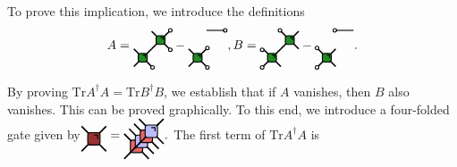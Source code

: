 \documentclass[aps,prx,twocolumn,notitlepage,nofootinbib,nobalancelastpage]{revtex4-2}
\theoremstyle{break}
\newcommand{\1}{\mathbbm{1}}
\theoremstyle{plain}
\theoremstyle{plain}
\theoremstyle{plain}
\newcommand{\Wgatedagger}[2]{
\draw[very thick] (#1-0.5, #2 +0.5) -- (#1+0.5,#2-0.5);
\draw[very thick] (#1-0.5,#2-0.5) -- (#1+0.5,#2+0.5);
\draw[ thick, fill=mygreenc, rounded corners=2pt] (#1-0.25,#2+0.25) rectangle (#1+0.25,#2-0.25);
\draw[thick] (#1,#2+0.15) -- (#1+0.15,#2+0.15) -- (#1+0.15,#2);
}
\newcommand{\Wgatered}[2]{
\draw[very thick] (#1-0.5, #2 +0.5) -- (#1+0.5,#2-0.5);
\draw[very thick] (#1-0.5,#2-0.5) -- (#1+0.5,#2+0.5);
\draw[ thick, fill=myred, rounded corners=2pt] (#1-0.25,#2+0.25) rectangle (#1+0.25,#2-0.25);
\draw[thick] (#1,#2+0.15) -- (#1+0.15,#2+0.15) -- (#1+0.15,#2);
}
\newcommand{\Wgateblue}[2]{
\draw[very thick] (#1-0.5, #2 +0.5) -- (#1+0.5,#2-0.5);
\draw[very thick] (#1-0.5,#2-0.5) -- (#1+0.5,#2+0.5);
\draw[ thick, fill=myblue, rounded corners=2pt] (#1-0.25,#2+0.25) rectangle (#1+0.25,#2-0.25);
\draw[thick] (#1,#2+0.15) -- (#1+0.15,#2+0.15) -- (#1+0.15,#2);
}
\newcommand{\Wgategreen}[2]{
\draw[very thick] (#1-0.5, #2 +0.5) -- (#1+0.5,#2-0.5);
\draw[very thick] (#1-0.5,#2-0.5) -- (#1+0.5,#2+0.5);
\draw[ thick, fill=mygreen, rounded corners=2pt] (#1-0.25,#2+0.25) rectangle (#1+0.25,#2-0.25);
\draw[thick] (#1,#2+0.15) -- (#1+0.15,#2+0.15) -- (#1+0.15,#2);
}
\newcommand{\MYcircle}[2]{
\draw[thick, fill=white] (#1,#2) circle (0.1cm); }
\begin{document}
To prove this implication, we introduce the definitions \begin{equation}
A=
\begin{tikzpicture}[baseline=(current  bounding  box.center), scale=0.5]
\Wgategreen{-0.5}{-0.5}
\Wgategreen{0.5}{0.5}
\MYcircle{1.05}{1.05}
\MYcircle{1.05}{-0.05}
\MYcircle{0.05}{-1.05}
\end{tikzpicture}
-
\begin{tikzpicture}[baseline=(current  bounding  box.center), scale=0.5]
\Wgategreen{-0.5}{-0.5}
\MYcircle{1.05}{1.05}
\MYcircle{0.05}{0.05}
\MYcircle{0.05}{-1.05}
\draw[thick] (0,1.05)--(1,1.05);
\end{tikzpicture}
,
B=
\begin{tikzpicture}[baseline=(current  bounding  box.center), scale=0.5]
\Wgategreen{-0.5}{-0.5}
\Wgategreen{0.5}{0.5}
\MYcircle{-0.05}{1.05}
\MYcircle{-1.05}{-0.05}
\MYcircle{-1.05}{-1.05}
\end{tikzpicture}
-
\begin{tikzpicture}[baseline=(current  bounding  box.center), scale=0.5]
\Wgategreen{-0.5}{-0.5}
\MYcircle{-0.05}{1.05}
\MYcircle{-1.05}{0.05}
\MYcircle{-1.05}{-1.05}
\draw[thick] (0,1.05)--(1,1.05);
\end{tikzpicture}
.
\end{equation}


By proving $\mathrm{Tr}A^{\dagger}A=\mathrm{Tr}B^{\dagger}B$, we establish that if $A$ vanishes, then $B$ also vanishes. This
can be proved graphically. To this end, we introduce a four-folded
gate given by$
\begin{tikzpicture}[baseline=(current  bounding  box.center), scale=0.7]
\Wgatedagger{0}{0}
\end{tikzpicture}
=
\begin{tikzpicture}[baseline=(current  bounding  box.center), scale=0.7]
\Wgatered{-0.3}{-0.3}
\Wgateblue{-0.1}{-0.1}
\Wgatered{0.1}{0.1}
\Wgateblue{0.3}{0.3}
\end{tikzpicture}
.
$
 The first term of $\mathrm{Tr}A^{\dagger}A$ is
\end{document}
